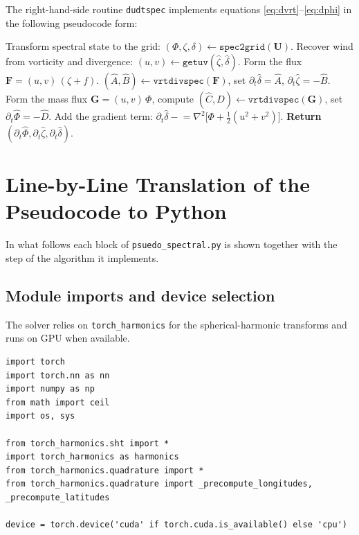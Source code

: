\documentclass[11pt]{article}
\newcommand{\bvec}[1]{\boldsymbol{#1}}
\begin{document}
\bigskip
\noindent The right-hand-side routine \texttt{dudtspec}
implements equations \eqref{eq:dvrt}--\eqref{eq:dphi}
in the following pseudocode form:

\begin{algorithm}[H]
\caption{\texttt{dudtspec}: tendency of $(\hat\Phi,\hat\zeta,\hat\delta)$.}
\begin{algorithmic}[1]
\State Transform spectral state to the grid:
       $(\Phi,\zeta,\delta) \gets \texttt{spec2grid}(\bvec{U})$.
\State Recover wind from vorticity and divergence:
       $(u,v) \gets \texttt{getuv}(\hat\zeta,\hat\delta)$.
\State Form the flux $\bvec{F} = (u,v)\,(\zeta + f)$.
\State $(\hat A,\hat B) \gets \texttt{vrtdivspec}(\bvec{F})$,
       set
       $\partial_t\hat\delta = \hat A$,
       $\partial_t\hat\zeta  = -\hat B$.
\State Form the mass flux $\bvec{G} = (u,v)\,\Phi$,
       compute $(\hat C,\hat D) \gets \texttt{vrtdivspec}(\bvec{G})$,
       set $\partial_t\hat\Phi = -\hat D$.
\State Add the gradient term:
       $\partial_t\hat\delta \mathrel{-}=
          \nabla^{2}\!\bigl[\Phi + \tfrac{1}{2}(u^{2}+v^{2})\bigr]$.
\State \textbf{Return} $(\partial_t\hat\Phi,\partial_t\hat\zeta,
                        \partial_t\hat\delta)$.
\end{algorithmic}
\end{algorithm}

\section{Line-by-Line Translation of the Pseudocode to Python}

In what follows each block of \texttt{psuedo\_spectral.py} is shown
together with the step of the algorithm it implements.

\subsection{Module imports and device selection}

The solver relies on \texttt{torch\_harmonics} for the spherical-harmonic
transforms and runs on GPU when available.

\begin{lstlisting}
import torch
import torch.nn as nn
import numpy as np
from math import ceil
import os, sys

from torch_harmonics.sht import *
import torch_harmonics as harmonics
from torch_harmonics.quadrature import *
from torch_harmonics.quadrature import _precompute_longitudes, _precompute_latitudes

device = torch.device('cuda' if torch.cuda.is_available() else 'cpu')
\end{lstlisting}
\end{document}
